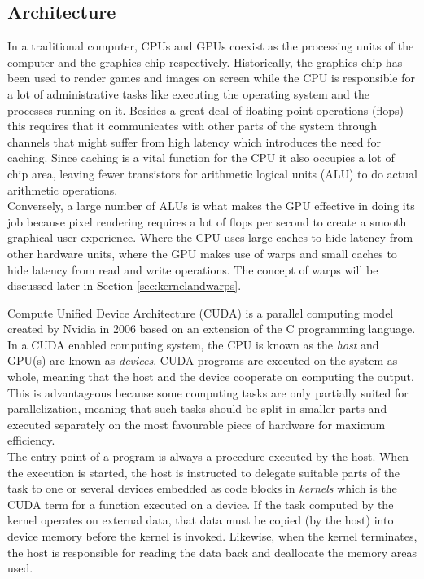 
\subsection{Architecture}
In a traditional computer, CPUs and GPUs coexist as the processing units of the computer and the graphics chip respectively. Historically, the graphics chip has been used to render games and images on screen while the CPU is responsible for a lot of administrative tasks like executing the operating system and the processes running on it. Besides a great deal of floating point operations (flops) this requires that it communicates with other parts of the system through channels that might suffer from high latency which introduces the need for caching. Since caching is a vital function for the CPU it also occupies a lot of chip area, leaving fewer transistors for arithmetic logical units (ALU) to do actual arithmetic operations. \\

Conversely, a large number of ALUs is what makes the GPU effective in doing its job because pixel rendering requires a lot of flops per second to create a smooth graphical user experience. Where the CPU uses large caches to hide latency from other hardware units, where the GPU makes use of warps and small caches to hide latency from read and write operations. The concept of warps will be discussed later in Section \ref{sec:kernelandwarps}.


Compute Unified Device Architecture (CUDA) is a parallel computing model created by Nvidia in 2006 \cite{pmpp} based on an extension of the C programming language. In a CUDA enabled computing system, the CPU is known as the \emph{host} and GPU(s) are known as \emph{devices}. CUDA programs are executed on the system as whole, meaning that the host and the device cooperate on computing the output. This is advantageous because some computing tasks are only partially suited for parallelization, meaning that such tasks should be split in smaller parts and executed separately on the most favourable piece of hardware for maximum efficiency.\\

The entry point of a program is always a procedure executed by the host. When the execution is started, the host is instructed to delegate suitable parts of the task to one or several devices embedded as code blocks in \emph{kernels} which is the CUDA term for a function executed on a device. If the task computed by the kernel operates on external data, that data must be copied (by the host) into device memory before the kernel is invoked. Likewise, when the kernel terminates, the host is responsible for reading the data back and deallocate the memory areas used.\\

